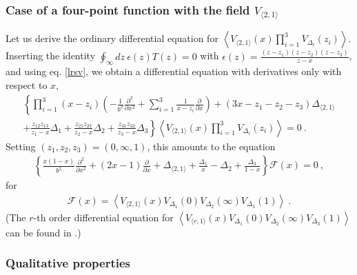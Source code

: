 \documentclass[12pt, a4paper, notitlepage, twoside]{report}
\numberwithin{equation}{section}
\theoremstyle{break}
\begin{document}
\subsubsection{Case of a four-point function with the field $V_{\langle 2,1 \rangle}$}

Let us derive the ordinary differential equation for $\left\langle V_{\langle 2,1 \rangle}(x)\prod_{i=1}^3 V_{\Delta_i}(z_i)\right\rangle$.
Inserting the identity $\oint_\infty dz\ \epsilon(z) T(z) =0$ with $\epsilon(z) = \frac{(z-z_1)(z-z_2)(z-z_3)}{z-x}$, and using eq. \eqref{lrsv}, we obtain a differential equation with derivatives only with respect to $x$, 
\begin{multline}
  \left\{ \prod_{i=1}^3(x-z_i)\left(-\frac{1}{b^2}\frac{\partial^2}{\partial x^2} +\sum_{i=1}^3 \frac{1}{x-z_i} {\frac{\partial}{\partial x}} \right) + (3x-z_1-z_2-z_3)\Delta_{\langle 2,1 \rangle} \right.
  \\
\left.  +\frac{z_{12}z_{13}}{z_1-x}\Delta_1 + \frac{z_{21}z_{23}}{z_2-x}\Delta_2+\frac{z_{31}z_{32}}{z_3-x}\Delta_3\right\} 
\left\langle V_{\langle 2,1 \rangle}(x)\prod_{i=1}^3 V_{\Delta_i}(z_i)\right\rangle  = 0\ . 
\end{multline}
Setting $(z_1,z_2,z_3)=(0,\infty,1)$, this amounts to the equation 
\begin{align}
  \left\{ \frac{x(1-x)}{b^2}\frac{\partial^2}{\partial x^2} + (2x-1){\frac{\partial}{\partial x}} +\Delta_{\langle 2,1 \rangle} +\frac{\Delta_1}{x}-\Delta_2 + \frac{\Delta_3}{1-x}\right\} \mathcal{F}(x)=0\ ,
\label{sode}
\end{align}
for 
\begin{align}
 \mathcal{F}(x) = \left\langle V_{\langle 2,1 \rangle}(x)V_{\Delta_1}(0)V_{\Delta_2}(\infty)V_{\Delta_3}(1)\right\rangle\ .
\label{fxv}
 \end{align}
(The $r$-th order differential equation for $\left\langle V_{\langle r,1 \rangle}(x)V_{\Delta_1}(0)V_{\Delta_2}(\infty)V_{\Delta_3}(1)\right\rangle $ can be found in \cite{flno09}.)

\subsubsection{Qualitative properties}
\end{document}
